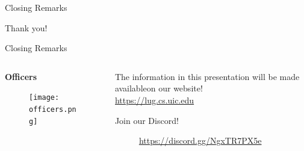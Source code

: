 \documentclass{beamer}
\begin{document}
\begin{frame}{Closing Remarks}
	\begin{center}
		\Huge Thank you!
	\end{center}
\end{frame}

\begin{frame}{Closing Remarks}
	\begin{columns}
		\begin{column}{0.5\textwidth}
			\textbf{Officers}
			\begin{figure}
				\centering
				\texttt{[image: officers.png]}
			\end{figure}
		\end{column}
		\begin{column}{0.5\textwidth}
			The information in this presentation will be made
			available\footnotemark on our website!\\
			\url{https://lug.cs.uic.edu}
			
			\bigskip
			Join our Discord!

			\begin{figure}
				\centering
				
				\caption{\scriptsize\url{https://discord.gg/NgxTR7PX5e}}
			\end{figure}
		\end{column}
	\end{columns}

\end{frame}
\end{document}
